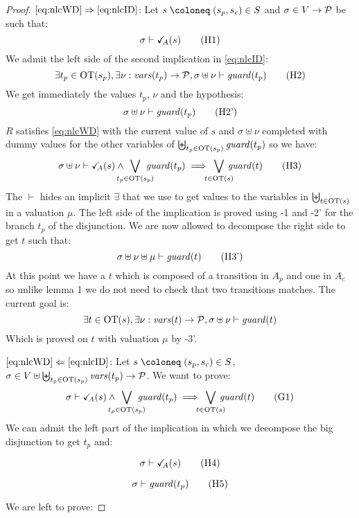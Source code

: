 \documentclass{article}
\begin{document}
\begin{proof}
\item[\(\eqref{eq:nlcWD}\Rightarrow\eqref{eq:nlcID}\):]
	Let \(s \defobject \mpar{s_p, s_c} \in S\) and \(\sigma \in V \to \mathcal{P}\) be such that:
	\[ \sigma \vdash \reach{A}\mpar{s} \hyp{1} \]
	We admit the left side of the second implication in \eqref{eq:nlcID}:
	\[ \exists t_p \in \fOT{s_p}, \exists \nu: \fvars{t_p} \to \values, \sigma \uplus \nu \vdash \fguard{t_p} \hyp{2} \]
	We get immediately the values \(t_p\), \(\nu\) and the hypothesis:
	\[ \sigma \uplus \nu \vdash \fguard{t_p} \hyp{2'} \]
	\(R\) satisfies \eqref{eq:nlcWD} with the current value of \(s\) and \(\sigma \uplus \nu\) completed with dummy values for the other variables of \(\biguplus_{t_p \in \mathrm{OT}{\left(s_p\right)}} \mathit{guard}{\left(t_p\right)}\) so we have:
	\[ \sigma \uplus \nu \vdash \reach{A}\mpar{s} \wedge \bigvee_\subbox{t_p \in \fOT{s_p}} \fguard{t_p} \implies \bigvee_\subbox{t \in \fOT{s}} \fguard{t} \hyp{3} \]
	The \(\vdash\) hides an implicit \(\exists\) that we use to get values to the variables in \(\biguplus_{t \in \mathrm{OT}{\left(s\right)}}\) in a valuation \(\mu\).
	The left side of the implication is proved using \hyp{1} and \hyp{2'} for the branch \(t_p\) of the disjunction.
	We are now allowed to decompose the right side to get \(t\) such that:
	\[ \sigma \uplus \nu \uplus \mu \vdash \fguard{t} \hyp{3'} \]
	At this point we have a \(t\) which is composed of a transition in \(A_p\) and one in \(A_c\) so unlike lemma 1 we do not need to check that two transitions matches.
	The current goal is:
	\[ \exists t \in \mathrm{OT}{\left(s\right)}, \exists \nu: \mathit{vars}{\left(t\right)} \to \mathcal{P}, \sigma \uplus \nu \vdash \mathit{guard}{\left(t\right)} \]
	Which is proved on \(t\) with valuation \(\mu\) by \hyp{3'}.
\item[\(\eqref{eq:nlcWD}\Leftarrow\eqref{eq:nlcID}\):]
	Let \(s \defobject \mpar{s_p, s_c} \in S\), \(\sigma \in V \uplus \biguplus_{t_p \in \mathrm{OT}{\left(s_p\right)}} \mathit{vars}{\left(t_p\right)} \to \mathcal{P}\).
	We want to prove:
	\[ \sigma \vdash \reach{A}\mpar{s} \wedge \bigvee_\subbox{t_p \in \fOT{s_p}} \fguard{t_p} \implies \bigvee_\subbox{t \in \fOT{s}} \fguard{t} \goal{1} \]
	We can admit the left part of the implication in which we decompose the big disjunction to get \(t_p\) and:\\
	\begin{minipage}{0.5\textwidth}\[ \sigma \vdash \reach{A}\mpar{s} \hyp{4} \]\end{minipage}
	\begin{minipage}{0.5\textwidth}\[ \sigma \vdash \fguard{t_p} \hyp{5} \]\end{minipage}
	We are left to prove:

\end{proof}
\end{document}
